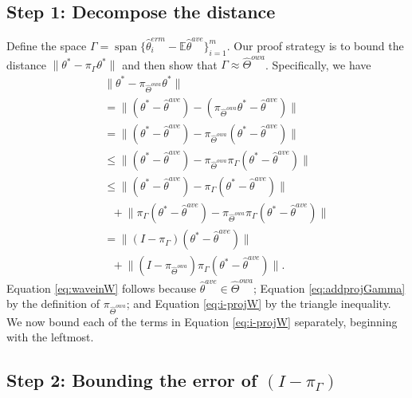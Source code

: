 \documentclass[twoside]{article}
\DeclareMathOperator*{\vecspan}{span}
\DeclareMathOperator*{\affspan}{aff}
\newcommand{\matW}{\hat W}
\newcommand{\W}{{\hat \Theta^{\textit{owa}}}}
\newcommand{\E}{\mathbb{E}}
\newcommand{\w}{\theta}
\newcommand{\wave}{\hat\w^{ave}}
\newcommand{\wmle}{\hat\w^{erm}}
\newcommand{\wstar}{{\w^{*}}}
\newcommand{\ltwo}[1]{{\lVert {#1} \rVert}}
\newcommand{\proj}[1]{\pi_{{#1}}}
\begin{document}
\subsection*{Step 1: Decompose the distance}

Define the space $\Gamma=\vecspan\{\wmle_i-\E\wave\}_{i=1}^m$.
Our proof strategy is to bound the distance $\ltwo{\wstar-\proj\Gamma\wstar}$ and then show that $\Gamma\approx\W$.
Specifically, we have
\begin{align}
~~~~&\!\!\!\!\!\!\!\!\!\!\!\!\!%
\ltwo{\wstar-\proj\W\wstar}
\nonumber
\\
&=
\ltwo{(\wstar-\wave) - (\proj\W\wstar - \wave)}
\\
&=
\ltwo{(\wstar-\wave) - \proj\W(\wstar - \wave)}
\label{eq:waveinW}
\\
&\le
\ltwo{(\wstar-\wave) - \proj\W\proj\Gamma(\wstar - \wave)}
\label{eq:addprojGamma}
\\
&\le
\ltwo{(\wstar-\wave) - \proj\Gamma(\wstar-\wave)}
\nonumber
\\
&~~~+
\ltwo{\proj\Gamma(\wstar-\wave) - \proj\W\proj\Gamma(\wstar-\wave)}
\\
&=
\ltwo{(I-\proj\Gamma)(\wstar - \wave)}
\nonumber
\\
&~~~+
\ltwo{(I-\proj\W)\proj\Gamma(\wstar - \wave)}
.
\label{eq:i-projW}
\end{align}
Equation \ref{eq:waveinW} follows because $\wave\in\W$;
Equation \ref{eq:addprojGamma} by the definition of $\proj\W$;
and Equation \ref{eq:i-projW} by the triangle inequality.
We now bound each of the terms in Equation \ref{eq:i-projW} separately,
beginning with the leftmost.

\subsection*{Step 2: Bounding the error of $(I-\proj{\Gamma})$}
\end{document}
